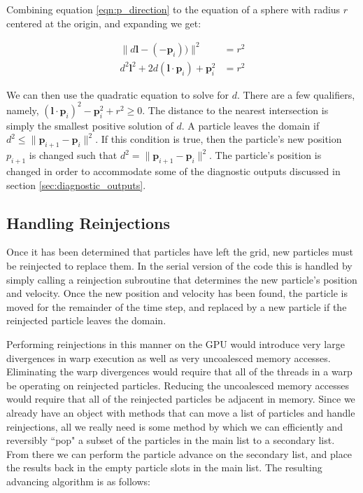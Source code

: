 Combining equation \ref{eqn:p_direction} to the equation of a sphere with radius $r$ centered at the origin, and expanding we get:

\begin{equation}
\begin{aligned}
\|d\mathbf{l} - (-\mathbf{p}_i)) \|^2  &= r^2 \\
d^2\mathbf{l}^2 + 2d(\mathbf{l}\cdot \mathbf{p}_i) + \mathbf{p}_i^2 &= r^2
		\end{aligned}
\end{equation}

We can then use the quadratic equation to solve for $d$. There are a few qualifiers, namely, $(\mathbf{l}\cdot \mathbf{p}_i)^2 - \mathbf{p}_i^2 + r^2 \geq 0$. The distance to the nearest intersection is simply the smallest positive solution of $d$. A particle leaves the domain if $d^2 \le \|\mathbf{p}_{i+1} - \mathbf{p}_{i}\|^2$. If this condition is true, then the particle's new position $p_{i+1}$ is changed such that $d^2 = \|\mathbf{p}_{i+1} - \mathbf{p}_{i}\|^2$. The particle's position is changed in order to accommodate some of the diagnostic outputs discussed in section \ref{sec:diagnostic_outputs}. 



		\subsection{Handling Reinjections}
Once it has been determined that particles have left the grid, new particles must be reinjected to replace them. In the serial version of the code this is handled by simply calling a reinjection subroutine that determines the new particle's position and velocity. Once the new position and velocity has been found, the particle is moved for the remainder of the time step, and replaced by a new particle if the reinjected particle leaves the domain.  

Performing reinjections in this manner on the GPU would introduce very large divergences in warp execution as well as very uncoalesced memory accesses. Eliminating the warp divergences would require that all of the threads in a warp be operating on reinjected particles. Reducing the uncoalesced memory accesses would require that all of the reinjected particles be adjacent in memory.  Since we already have an object with methods that can move a list of particles and handle reinjections, all we really need is some method by which we can efficiently and reversibly ``pop" a subset of the particles in the main list to a secondary list. From there we can perform the particle advance on the secondary list, and place the results back in the empty particle slots in the main list. The resulting advancing algorithm is as follows:

